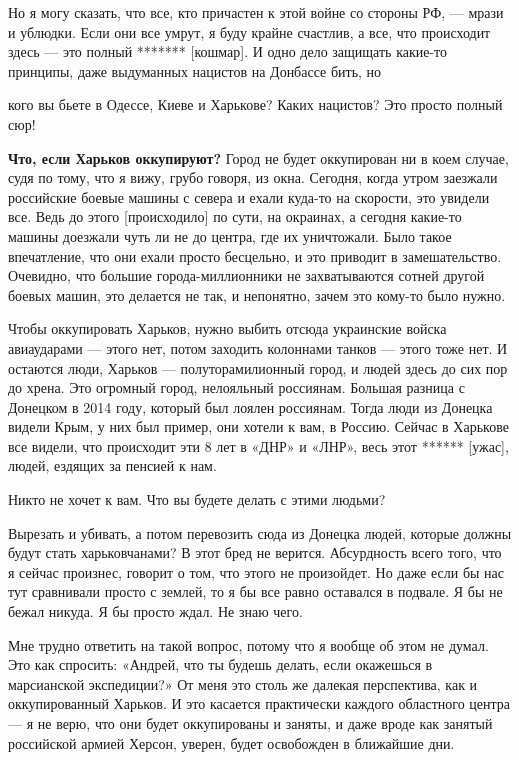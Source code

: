 Но я могу сказать, что все, кто причастен к этой войне со стороны РФ, --- мрази и ублюдки. Если они все умрут, я буду крайне счастлив, а все, что происходит здесь --- это полный ******* [кошмар]. И одно дело защищать какие-то принципы, даже выдуманных нацистов на Донбассе бить, но

\begin{fancyquotes}
    кого вы бьете в Одессе, Киеве и Харькове? Каких нацистов? Это просто полный сюр!
\end{fancyquotes}

\textbf{Что, если Харьков оккупируют?}
Город не будет оккупирован ни в коем случае, судя по тому, что я вижу, грубо говоря, из окна. Сегодня, когда утром заезжали российские боевые машины с севера и ехали куда-то на скорости, это увидели все. Ведь до этого [происходило] по сути, на окраинах, а сегодня какие-то машины доезжали чуть ли не до центра, где их уничтожали. Было такое впечатление, что они ехали просто бесцельно, и это приводит в замешательство. Очевидно, что большие города-миллионники не захватываются сотней другой боевых машин, это делается не так, и непонятно, зачем это кому-то было нужно.

Чтобы оккупировать Харьков, нужно выбить отсюда украинские войска авиаударами --- этого нет, потом заходить колоннами танков --- этого тоже нет. И остаются люди, Харьков --- полуторамилионный город, и людей здесь до сих пор до хрена. Это огромный город, нелояльный россиянам. Большая разница с Донецком в 2014 году, который был лоялен россиянам. Тогда люди из Донецка видели Крым, у них был пример, они хотели к вам, в Россию. Сейчас в Харькове все видели, что происходит эти 8 лет в «ДНР» и «ЛНР», весь этот ****** [ужас], людей, ездящих за пенсией к нам.

\begin{fancyquotes}
    Никто не хочет к вам. Что вы будете делать с этими людьми?
\end{fancyquotes}

Вырезать и убивать, а потом перевозить сюда из Донецка людей, которые должны будут стать харьковчанами? В этот бред не верится. Абсурдность всего того, что я сейчас произнес, говорит о том, что этого не произойдет. Но даже если бы нас тут сравнивали просто с землей, то я бы все равно оставался в подвале. Я бы не бежал никуда. Я бы просто ждал. Не знаю чего.

Мне трудно ответить на такой вопрос, потому что я вообще об этом не думал. Это как спросить: «Андрей, что ты будешь делать, если окажешься в марсианской экспедиции?» От меня это столь же далекая перспектива, как и оккупированный Харьков. И это касается практически каждого областного центра --- я не верю, что они будет оккупированы и заняты, и даже вроде как занятый российской армией Херсон, уверен, будет освобожден в ближайшие дни.

